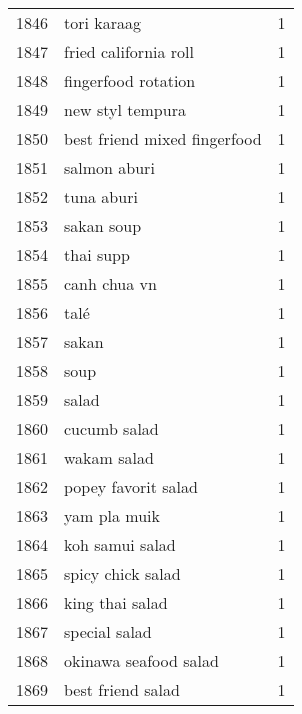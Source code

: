 \begin{tabular}{llr}
1846 &                                        tori karaag &      1 \\
1847 &                              fried california roll &      1 \\
1848 &                                fingerfood rotation &      1 \\
1849 &                                   new styl tempura &      1 \\
1850 &                       best friend mixed fingerfood &      1 \\
1851 &                                       salmon aburi &      1 \\
1852 &                                         tuna aburi &      1 \\
1853 &                                         sakan soup &      1 \\
1854 &                                          thai supp &      1 \\
1855 &                                       canh chua vn &      1 \\
1856 &                                               talé &      1 \\
1857 &                                              sakan &      1 \\
1858 &                                               soup &      1 \\
1859 &                                              salad &      1 \\
1860 &                                       cucumb salad &      1 \\
1861 &                                        wakam salad &      1 \\
1862 &                                popey favorit salad &      1 \\
1863 &                                       yam pla muik &      1 \\
1864 &                                    koh samui salad &      1 \\
1865 &                                  spicy chick salad &      1 \\
1866 &                                    king thai salad &      1 \\
1867 &                                      special salad &      1 \\
1868 &                              okinawa seafood salad &      1 \\
1869 &                                  best friend salad &      1 \\

\end{tabular}
